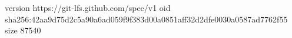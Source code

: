 version https://git-lfs.github.com/spec/v1
oid sha256:42aa9d75d2c5a90a6ad059f9f383d00a0851aff32d2dfe0030a0587ad7762f55
size 87540
